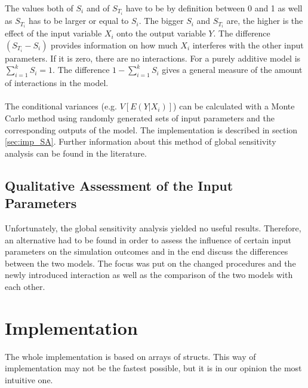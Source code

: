 \documentclass[11pt]{article}
\begin{document}
The values both of $S_i$ and of $S_{T_i}$ have to be by definition between 0 and 1 as well as  $S_{T_i}$ has to be larger or equal to $S_i$. The bigger $S_i$ and $S_{T_i}$ are, the higher is the effect of the input variable $X_i$ onto the output variable $Y$. The difference $(S_{T_i} - S_i)$ provides information on how much $X_i$ interferes with the other input parameters. If it is zero, there are no interactions. For a purely additive model is $\sum_{i=1}^k S_i = 1$. The difference $1 - \sum_{i=1}^k S_i$ gives a general measure of the amount of interactions in the model.\\
\\
The conditional variances (e.g. $V[E(Y|X_i)]$) can be calculated with a Monte Carlo method using randomly generated sets of input parameters and the corresponding outputs of the model. The implementation is described in section \ref{sec:imp_SA}. Further information about this method of global sensitivity analysis can be found in the literature.

\subsection{Qualitative Assessment of the Input Parameters}
Unfortunately, the global sensitivity analysis yielded no useful results. Therefore, an alternative had to be found in order to assess the influence of certain input parameters on the simulation outcomes and in the end discuss the differences between the two models. The focus was put on the changed procedures and the newly introduced interaction as well as the comparison of the two models with each other.

\section{Implementation}
The whole implementation is based on arrays of structs. This way of implementation may not be the fastest possible, but it is in our opinion the most intuitive one.
\end{document}
